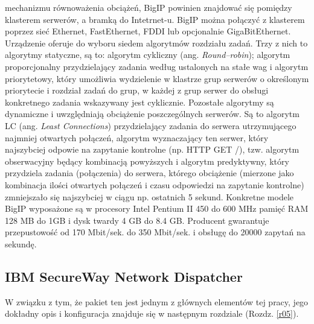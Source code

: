 mechanizmu równoważenia obciążeń, BigIP powinien znajdować się pomiędzy klasterem serwerów, a bramką do 
Intetrnet-u. BigIP można połączyć z klasterem poprzez sieć Ethernet, FastEthernet, FDDI lub opcjonalnie 
GigaBitEthernet. Urządzenie oferuje do wyboru siedem algorytmów rozdziału zadań. Trzy z nich to algorytmy 
statyczne, są to: algorytm cykliczny (ang. \emph{Round--robin}); algorytm proporcjonalny przydzielający zadania według 
ustalonych na stałe wag i algorytm priorytetowy, który umożliwia wydzielenie w klastrze grup serwerów o 
określonym priorytecie i rozdział zadań do grup, w każdej z grup serwer do obsługi konkretnego zadania 
wskazywany jest cyklicznie. Pozostałe algorytmy są dynamiczne i uwzględniają obciążenie poszczególnych 
serwerów. Są to algorytm LC (ang. \emph{Least Connections}) przydzielający zadania do serwera utrzymującego najmniej 
otwartych połączeń, algorytm wyznaczający ten serwer, który najszybciej odpowie na zapytanie kontrolne (np. 
HTTP GET /), tzw. algorytm obserwacyjny będący kombinacją powyższych i algorytm predyktywny, który przydziela 
zadania (połączenia) do serwera, którego obciążenie (mierzone jako kombinacja ilości otwartych połączeń i czasu 
odpowiedzi na zapytanie kontrolne) zmniejszało się najszybciej w ciągu np. ostatnich 5 sekund.
Konkretne modele BigIP wyposażone są w procesory Intel Pentium II 450 do 600 MHz pamięć RAM 128 MB do 
1GB i dysk twardy 4 GB do 8.4 GB. Producent gwarantuje przepustowość od 170 Mbit/sek. do 350 Mbit/sek. i 
obsługę do 20000 zapytań na sekundę.
	
\subsection{IBM SecureWay Network Dispatcher}

W związku z tym, że pakiet ten jest jednym z głównych elementów tej pracy, jego dokładny opis i konfiguracja znajduje się 
w następnym rozdziale (Rozdz. \ref{r05}).

